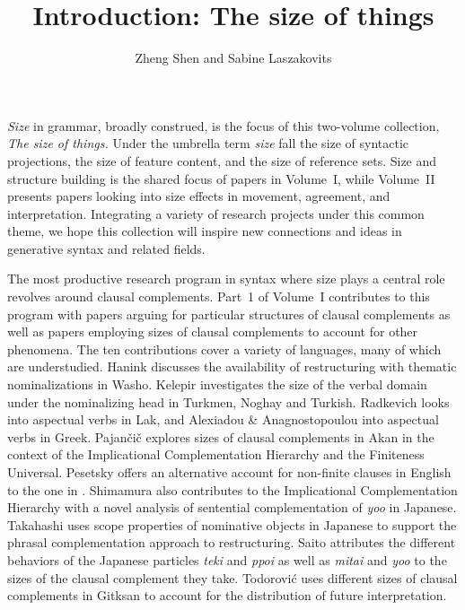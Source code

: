 \documentclass[output=paper]{langscibook}
\author{Zheng Shen\affiliation{National University of Singapore} and Sabine Laszakovits\affiliation{Austrian Academy of Sciences; University of Connecticut}}
\title{Introduction: The size of things}
\begin{document}
\maketitle

\noindent\textit{Size} in grammar, broadly construed, is the focus of this two-volume collection, \textit{The size of things.}
Under the umbrella term \textit{size} fall the size of syntactic projections, the size of feature content, and the size of  reference sets. 
Size and structure building is the shared focus of papers in Volume~I, while Volume~II presents papers looking into size effects in movement, agreement, and interpretation. 
Integrating a variety of research projects under this common theme, we hope this collection will inspire new connections and ideas in generative syntax and related fields. 

The most productive research program in syntax where size plays a central role revolves around clausal complements. 
Part~1 of Volume~I contributes to this program with papers arguing for particular structures of clausal complements as well as papers employing sizes of clausal complements to account for other phenomena. 
The ten contributions cover a variety of languages, many of which are understudied. 
Hanink discusses the availability of restructuring with thematic nominalizations in Washo. 
Kelepir investigates the size of the verbal domain under the nominalizing head in Turkmen, Noghay and Turkish. 
Radkevich looks into aspectual verbs in Lak, and Alexiadou \& Anagnostopoulou into aspectual verbs in Greek.
Pajančič explores sizes of clausal complements in Akan in the context of the Implicational Complementation Hierarchy and the Finiteness Universal. 
Pesetsky offers an alternative account for non-finite clauses in English to the one in \citet{Wurmbrand:2014}.
Shimamura also contributes to the Implicational Complementation Hierarchy with a novel analysis of sentential complementation of \textit{yoo} in Japanese. 
Takahashi uses scope properties of nominative objects in Japanese to support the phrasal complementation approach to restructuring. 
Saito attributes the different behaviors of the Japanese particles \textit{teki} and \textit{ppoi} as well as \textit{mitai} and \textit{yoo} to the sizes of the clausal complement they take.
Todorović uses different sizes of clausal complements in Gitksan to account for the distribution of future interpretation. 
\end{document}
